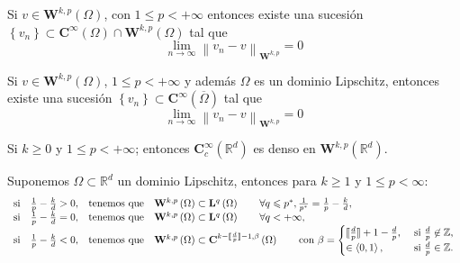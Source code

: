 \begin{teo}
	Si $v\in \mathbf{W}^{k,p}\left( \Omega \right) $, con $1\leqslant p<+\infty $
	entonces existe una sucesión $\left\{ v_{n}\right\} \subset \mathbf{C}^{\infty
	}\left( \Omega \right) \cap \mathbf{W}^{k,p}\left( \Omega \right) $ tal que
	\[
	\lim_{n\rightarrow \infty }\left\| v_{n}-v\right\| _{\mathbf{W}^{k,p}}=0
	\]
\end{teo}
\begin{teo}
	Si $v\in \mathbf{W}^{k,p}\left( \Omega \right)$, $1\leqslant p<+\infty $ y
	además $\Omega $ es un dominio Lipschitz, entonces existe una
	sucesión $\left\{ v_{n}\right\} \subset \mathbf{C}^{\infty }\left(
	\overline{\Omega }\right) $ tal que
	\[
	\lim_{n\rightarrow \infty }\left\| v_{n}-v\right\| _{\mathbf{W}^{k,p}}=0
	\]
\end{teo}
%
\begin{teo}
	Si $k\geqslant 0$ y $1\leqslant p<+\infty $; entonces $\mathbf{C}_{c}^{\infty }(\mathbb{R}%
	^{d})$ es denso en $\mathbf{W}^{k,p}\left( \mathbb{R}%
	^{d} \right) $.
\end{teo}

\begin{teo}
	\label{teo_desi_sobolev}Suponemos $\Omega \subset \mathbb{R}^{d}$ un
	dominio Lipschitz, entonces para $k\geqslant 1$ y
	$1\leqslant p<\infty$:
	\[
	\begin{array}[c]{ccll}
		\textrm{si} & \frac{1}{p}-\frac{k}{d}>0, & \textrm{tenemos que} & \mathbf{W}%
		^{k,p}\left( \Omega \right) \subset \mathbf{L}^{q}\left( \Omega \right)
		\textrm{\qquad }\forall q\leqslant p^{*},\frac{1}{p^{*}}=\frac{1}{p}-\frac{k}{d%
		}, \\
		\textrm{si} & \frac{1}{p}-\frac{k}{d}=0, & \textrm{tenemos que} & \mathbf{W}%
		^{k,p}\left( \Omega \right) \subset \mathbf{L}^{q}\left( \Omega \right)
		\textrm{\qquad }\forall q<+\infty , \\
		\textrm{si} & \frac{1}{p}-\frac{k}{d}<0, & \textrm{tenemos que} & \mathbf{W}%
		^{k,p}\left( \Omega \right) \subset \mathbf{C}^{k-\llbracket \frac{d}{p}\rrbracket -1,\beta}\left( \Omega
		\right) \textrm{\qquad con } \beta =\begin{cases}
			\llbracket \frac{d}{p}\rrbracket +1-\frac{d}{p}, &
			\text{ si }\frac{d}{p}\not\in\mathbb{Z},\\
			\in \left<0,1\right>,&\text{ si } \frac{d}{p}\in\mathbb{Z}.\\
		\end{cases}
	\end{array}
	\]
\end{teo}

